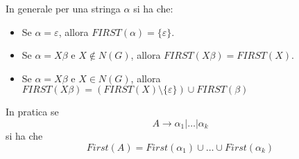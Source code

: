 In generale per una stringa $\alpha$ si ha che:
\begin{itemize}
    \item Se \( \alpha = \varepsilon \), allora \( FIRST(\alpha) = \{\varepsilon\} \).
    \item Se \( \alpha = X \beta \) e \( X \notin N(G) \), allora \( FIRST(X \beta) = FIRST(X) \).
    \item Se \( \alpha = X \beta \) e \( X \in N(G) \), allora $FIRST(X \beta) = (FIRST(X) \setminus \{\varepsilon\}) \cup FIRST(\beta)$
\end{itemize}

In pratica se 
\[
    A\to \alpha_1 | \dots | \alpha_k    
\]
si ha che
\[
    First(A) = First (\alpha_1)\cup\dots\cup First(\alpha_k)   
\]

